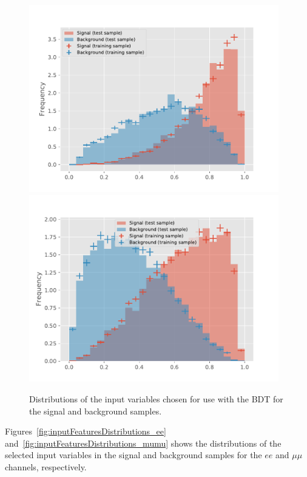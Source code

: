 \begin{figure}[htb]
\centering
\includegraphics[width=0.97\textwidth]{figs/background-estimation/plots/response_ee.pdf}
\\
\includegraphics[width=0.97\textwidth]{figs/background-estimation/plots/response_mumu.pdf}
\caption{
Distributions of the input variables chosen for use with the BDT for the signal and background samples.}
\label{fig:bdtResponse}
\end{figure}

Figures~\ref{fig:inputFeaturesDistributions_ee} and~\ref{fig:inputFeaturesDistributions_mumu} shows the distributions of the selected input variables in the signal and background samples for the $ee$ and $\mu\mu$ channels, respectively.

